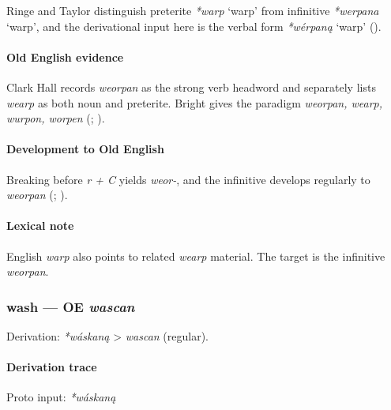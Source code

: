 \documentclass[
  british,
  a4paper,
]{article}
\providecommand{\Recon}[1]{\emph{*#1}}
\begin{document}
Ringe and Taylor distinguish preterite \Recon{warp} `warp' from
infinitive \Recon{werpana} `warp', and the derivational input here is
the verbal form \Recon{wérpaną} `warp'
().

\paragraph{Old English evidence}\label{old-english-evidence-65}

Clark Hall records \emph{weorpan} as the strong verb headword and
separately lists \emph{wearp} as both noun and preterite. Bright gives
the paradigm \emph{weorpan, wearp, wurpon, worpen}
(;
).

\paragraph{Development to Old
English}\label{development-to-old-english-65}

Breaking before \emph{r + C} yields \emph{weor-}, and the infinitive
develops regularly to \emph{weorpan}
(;
).

\paragraph{Lexical note}\label{lexical-note-2}

English \emph{warp} also points to related \emph{wearp} material. The
target is the infinitive \emph{weorpan}.

\subsubsection{\texorpdfstring{wash --- OE
\emph{wascan}}{wash --- OE wascan}}\label{wash-oe-wascan}

Derivation: \emph{*wáskaną} \textgreater{} \emph{wascan} (regular).

\paragraph{Derivation trace}\label{derivation-trace-70}

Proto input: \emph{*wáskaną}

\begingroup
\setlength{\fboxsep}{6pt}
\end{document}
